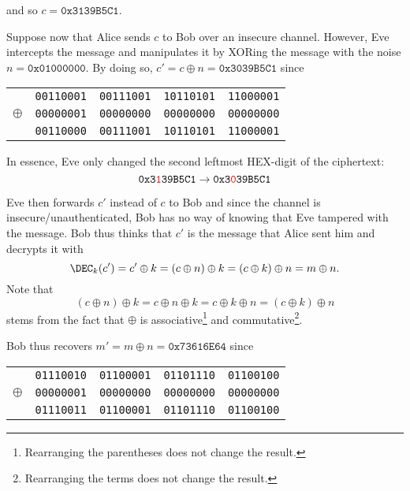 \documentclass[parskip=half]{scrartcl}
\begin{document}
and so $c = \mathtt{0x3139B5C1}$.

Suppose now that Alice sends $c$ to Bob over an insecure channel. 
However, Eve intercepts the message and manipulates it by XORing the message with the noise $n = \mathtt{0x01000000}$.
By doing so, $c' = c \oplus n = \mathtt{0x3039B5C1}$ since
\begin{table}[h!]
  \centering
  \begin{tabular}{@{}ccccc@{}}
    & \texttt{00110001} & \texttt{00111001} & \texttt{10110101} & \texttt{11000001}\\
    $\oplus$
    & \texttt{00000001} & \texttt{00000000} & \texttt{00000000} & \texttt{00000000}\\
    \midrule
    & \texttt{00110000} & \texttt{00111001} & \texttt{10110101} & \texttt{11000001}
  \end{tabular}
  \vspace*{-.8em}
\end{table}

In essence, Eve only changed the second leftmost HEX-digit of the ciphertext:
\[
  \mathtt{0x3{\textcolor{red}1}39B5C1} \to \mathtt{0x3{\textcolor{red}0}39B5C1}
\]

Eve then forwards $c'$ instead of $c$ to Bob and since the channel is insecure/unauthenticated, Bob has no way of knowing that Eve tampered with the message.
Bob thus thinks that $c'$ is the message that Alice sent him and decrypts it with
\[
  \DEC_k(c') = c' \oplus k = (c \oplus n) \oplus k = (c \oplus k) \oplus n = m \oplus n.
\]
Note that
\[
  (c \oplus n) \oplus k = c \oplus n \oplus k = c \oplus k \oplus n = (c \oplus k) \oplus n
\]
stems from the fact that $\oplus$ is associative\footnote{Rearranging the parentheses does not change the result.} and commutative\footnote{Rearranging the terms does not change the result.}.

Bob thus recovers $m' = m \oplus n = \mathtt{0x73616E64}$ since
\begin{table}[h!]
  \centering
  \begin{tabular}{@{}ccccc@{}}
    & \texttt{01110010} & \texttt{01100001} & \texttt{01101110} & \texttt{01100100}\\
    $\oplus$
    & \texttt{00000001} & \texttt{00000000} & \texttt{00000000} & \texttt{00000000}\\
    \midrule
    & \texttt{01110011} & \texttt{01100001} & \texttt{01101110} & \texttt{01100100}
  \end{tabular}
  \vspace*{-.8em}
\end{table}
\end{document}
